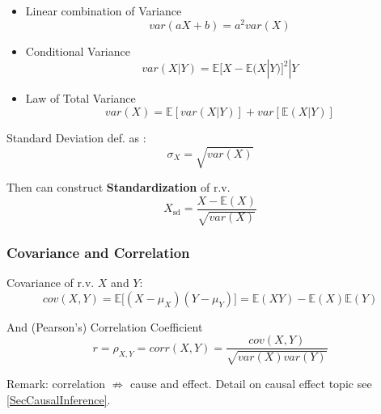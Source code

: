 \begin{itemize} 
    \item Linear combination of Variance\begin{equation}
        var(aX+b)=a^2var(X)
    \end{equation}
    \item Conditional Variance
    \begin{equation}
        var(X|Y)=\mathbb{E}{[X-\mathbb{E}(X|Y)]^2|Y}
    \end{equation}
    \item Law of Total Variance\begin{equation}
        var(X)=\mathbb{E}[var(X|Y)]+var[\mathbb{E}(X|Y)]
    \end{equation}
\end{itemize}

    Standard Deviation def. as :
    \begin{equation}\sigma_X=\sqrt{var(X)}\end{equation}

    Then can construct \textbf{Standardization} of r.v.
    \begin{equation}X_\mathrm{sd} =\frac{X-\mathbb{E}(X)}{\sqrt{var(X)}}\end{equation}


\subsubsection{Covariance and Correlation}\label{SubSubSectionCovarianceAndCorrelation}
    Covariance of r.v. $X$ and $Y$:\begin{equation}
        cov(X,Y)=\mathbb{E}\big[(X-\mu_X)(Y-\mu_Y)\big]=\mathbb{E}(XY)-\mathbb{E}(X)\mathbb{E}(Y)
    \end{equation}

    And (Pearson's) Correlation Coefficient
    \begin{equation}
        r=\rho_{X,Y}=corr(X,Y)=\frac{cov(X,Y)}{\sqrt{var(X)var(Y)}}
    \end{equation}

    Remark: correlation $\nRightarrow$ cause and effect. 
    Detail on causal effect topic see \autoref{SecCausalInference}.

